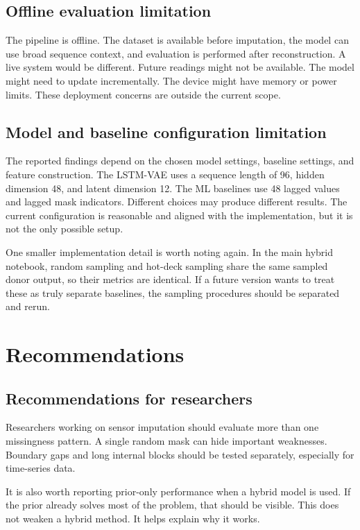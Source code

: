 \subsection{Offline evaluation limitation}

The pipeline is offline. The dataset is available before imputation, the model can use broad sequence context, and evaluation is performed after reconstruction. A live system would be different. Future readings might not be available. The model might need to update incrementally. The device might have memory or power limits. These deployment concerns are outside the current scope.

\subsection{Model and baseline configuration limitation}

The reported findings depend on the chosen model settings, baseline settings, and feature construction. The LSTM-VAE uses a sequence length of 96, hidden dimension 48, and latent dimension 12. The ML baselines use 48 lagged values and lagged mask indicators. Different choices may produce different results. The current configuration is reasonable and aligned with the implementation, but it is not the only possible setup.

One smaller implementation detail is worth noting again. In the main hybrid notebook, random sampling and hot-deck sampling share the same sampled donor output, so their metrics are identical. If a future version wants to treat these as truly separate baselines, the sampling procedures should be separated and rerun.

\section{Recommendations}

\subsection{Recommendations for researchers}

Researchers working on sensor imputation should evaluate more than one missingness pattern. A single random mask can hide important weaknesses. Boundary gaps and long internal blocks should be tested separately, especially for time-series data.

It is also worth reporting prior-only performance when a hybrid model is used. If the prior already solves most of the problem, that should be visible. This does not weaken a hybrid method. It helps explain why it works.

